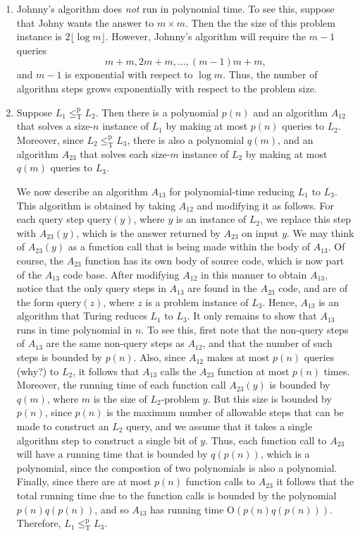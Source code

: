 \documentclass [12pt]{article}
\theoremstyle{definition}
\begin{document}
\begin{enumerate}
\item Johnny's algorithm does \textit{not} run in polynomial time. To see this, suppose that Johny wants the answer to $m\times m$. Then 
the the size of this problem instance is $2\lfloor\log m\rfloor$. However, Johnny's algorithm will require the $m-1$ queries 
\[m+m, 2m+m, \ldots, (m-1)m+m,\]
and $m-1$ is exponential with respect to $\log m$. Thus, the number of algorithm steps grows exponentially with respect to the problem size.

\item Suppose $L_{1}\leq_{\mbox{T}}^{\mbox{p}}L_{2}$. Then there is a polynomial $p(n)$ and an algorithm $A_{12}$ that solves a size-$n$ instance of 
$L_{1}$ by making at most $p(n)$ queries to $L_{2}$. Moreover, since  $L_{2}\leq_{\mbox{T}}^{\mbox{p}}L_{3}$, 
there is also a polynomial $q(m)$, and an algorithm $A_{23}$ that solves each size-$m$ instance of $L_{2}$ by making
at most $q(m)$ queries to $L_{3}$. 

We now describe an algorithm $A_{13}$ for polynomial-time reducing $L_{1}$ to $L_{3}$. 
This algorithm  is obtained by taking $A_{12}$ and modifying it
as follows. For each query step $\mbox{query}(y)$, where $y$ is an instance of $L_{2}$, we replace this step with $A_{23}(y)$, which is the answer returned by $A_{23}$ on input $y$.
We may think of $A_{23}(y)$ as a function call that is being made within the body of $A_{13}$. Of course, the $A_{23}$ function has its own body of source code, which is now part of the $A_{13}$ code base.
After modifying $A_{12}$ in this manner to obtain $A_{13}$, notice that the only query steps in  $A_{13}$ are found in the $A_{23}$ code, and are of the form $\mbox{query}(z)$, where
$z$ is a problem instance of $L_{3}$. Hence, $A_{13}$ is an algorithm that Turing reduces $L_{1}$ to $L_{3}$. It only remains to show that $A_{13}$ runs in time polynomial in $n$.
To see this, first note that the non-query steps of  $A_{13}$ are the same non-query steps as $A_{12}$, and that the number of such steps is bounded by $p(n)$. Also, since $A_{12}$ makes at most
$p(n)$ queries (why?) to $L_{2}$, it follows that  $A_{13}$ calls the $A_{23}$ function at most $p(n)$ times. Moreover, the running time of each function call $A_{23}(y)$ is bounded by $q(m)$, where
$m$ is the size of $L_{2}$-problem $y$. But this size is bounded by $p(n)$, since $p(n)$ is the maximum number of allowable steps that can be made to construct an $L_{2}$ query, and we assume that
it takes a single algorithm step to construct a single bit of $y$. Thus, each function call to $A_{23}$ will have a running time that is bounded by $q(p(n))$, which is a polynomial, since the compostion of 
two polynomials is also a polynomial.  Finally, since there are at most $p(n)$ function calls to $A_{23}$ it follows that the total running time due to the function calls is 
bounded by the polynomial  $p(n)q(p(n))$, and so $A_{13}$ has running time $\mbox{O}(p(n)q(p(n)))$. Therefore, $L_{1}\leq_{\mbox{T}}^{\mbox{p}}L_{3}$.



\end{enumerate}
\end{document}
